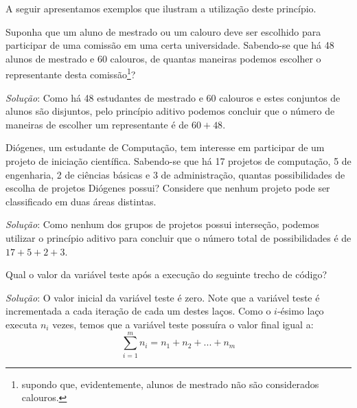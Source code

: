 A seguir apresentamos exemplos que ilustram a utilização deste
princípio.

\begin{Example}
Suponha que um aluno de mestrado ou um calouro deve ser escolhido para
participar de uma comissão em uma certa universidade. Sabendo-se que
há 48 alunos de mestrado e 60 calouros, de quantas maneiras podemos
escolher o representante desta comissão\footnote{supondo que, evidentemente,
alunos de mestrado não são considerados calouros.}?

\textit{Solução}: Como há 48 estudantes de mestrado e 60 calouros e
estes conjuntos de alunos são disjuntos, pelo princípio aditivo
podemos concluir que o número de maneiras de escolher um representante
é de $60 + 48$.
\end{Example}

\begin{Example}
Diógenes, um estudante de Computação, tem interesse em participar de
um projeto de iniciação científica. Sabendo-se que há 17 projetos de
computação, 5 de engenharia, 2 de ciências básicas e 3 de
administração, quantas possibilidades de escolha de projetos Diógenes
possui? Considere que nenhum projeto pode ser classificado em duas
áreas distintas.

\textit{Solução}: Como nenhum dos grupos de projetos possui
interseção, podemos utilizar o princípio aditivo para concluir que o
número total de possibilidades é de $17 + 5 + 2 + 3$.
\end{Example}

\begin{Example}
Qual o valor da variável teste após a execução do seguinte trecho de
código?
\begin{algorithm}
  \begin{algorithmic}[0]
      \EndFor
      \EndFor
      \State{$\vdots$}
      \EndFor
  \end{algorithmic}
\end{algorithm}

\textit{Solução}: O valor inicial da variável teste é zero. Note que a
variável teste é incrementada a cada iteração de cada um destes
laços. Como o $i$-ésimo laço executa $n_i$ vezes, temos que a variável
teste possuíra o valor final igual a:
\[
\sum_{i=1}^mn_i = n_1 + n_2 + ... +n_m
\]
\end{Example}

